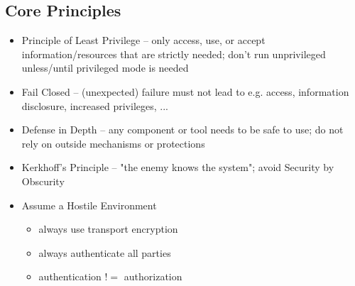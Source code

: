 \documentclass[xga]{xdvislides}
\begin{document}
\subsection{Core Principles}

\begin{itemize}
	\item Principle of Least Privilege -- only access, use, or accept
		information/resources that are strictly needed; don't run
		unprivileged unless/until privileged mode is needed
	\item Fail Closed -- (unexpected) failure must
		not lead to e.g. access, information disclosure,
		increased privileges, ...
	\item Defense in Depth -- any component or tool needs to be safe
		to use; do not rely on outside mechanisms or protections
	\item Kerkhoff's Principle -- "the enemy knows the system"; avoid Security by Obscurity
	\item Assume a Hostile Environment
		\begin{itemize}
			\item always use transport encryption
			\item always authenticate all parties
			\item authentication $!=$ authorization
		\end{itemize}
\end{itemize}
%
%
%
\end{document}
